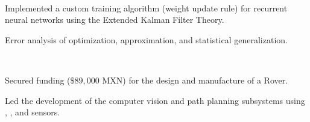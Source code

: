 \documentclass[]{tex/deedy-resume-openfont}
\begin{document}
\begin{minipage}[t]{0.67\textwidth}
\\
\begin{tightemize}
    \item Implemented a custom training algorithm (weight update rule) for recurrent neural networks using the Extended Kalman Filter Theory.
    \item Error analysis of optimization, approximation, and statistical generalization.
\end{tightemize}
\sectionsep

\\
\begin{tightemize}
    \item Secured funding ($\$89,000$ MXN) for the design and manufacture of a Rover.
    \item Led the development of the computer vision and path planning subsystems using , , and  sensors.
\end{tightemize}


\end{minipage} 
\end{document}
